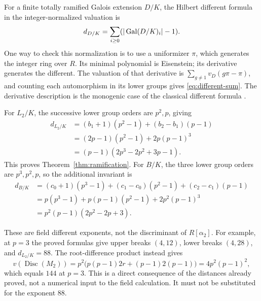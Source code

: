 For a finite totally ramified Galois extension \(D/K\), the
Hilbert different formula in the integer-normalized valuation is
\begin{equation}\label{eq:different-sum}
 d_{D/K}=\sum_{i\ge0}(|\operatorname{Gal}(D/K)_i|-1).
\end{equation}
One way to check this normalization is to use a uniformizer
\(\pi\), which generates the integer ring over \(R\).
Its minimal polynomial is Eisenstein; its derivative
generates the different. The valuation of that derivative
is \(\sum_{g\ne1}v_D(g\pi-\pi)\), and counting each
automorphism in its lower groups gives
\eqref{eq:different-sum}. The derivative description is
the monogenic case of the classical different formula
\cite[Tags 0BWD and 0BWG]{stacksdifferent}.

For \(L_2/K\), the successive lower group orders are
\(p^2,p\), giving
\[
 \begin{aligned}
 d_{L_2/K}
 &=(b_1+1)(p^2-1)+(b_2-b_1)(p-1)\\
 &=(2p-1)(p^2-1)+2p(p-1)^3\\
 &=(p-1)(2p^3-2p^2+3p-1).
 \end{aligned}
\]
This proves Theorem~\ref{thm:ramification}.
For \(B/K\), the three lower group orders are \(p^3,p^2,p\),
so the additional invariant is
\[
 \begin{aligned}
 d_{B/K}
 &=(c_0+1)(p^3-1)+(c_1-c_0)(p^2-1)
   +(c_2-c_1)(p-1)\\
 &=p(p^3-1)+p(p-1)(p^2-1)+2p^2(p-1)^3\\
 &=p^2(p-1)(2p^2-2p+3).
 \end{aligned}
\]

These are field different exponents, not the discriminant
of \(R[\alpha_2]\). For example, at \(p=3\) the proved
formulas give upper breaks \((4,12)\), lower breaks
\((4,28)\), and \(d_{L_2/K}=88\).
The root-difference product instead gives
\[
 v(\operatorname{Disc}(M_2))
 =p^2\bigl(p(p-1)2r+(p-1)2(p-1)\bigr)
 =4p^2(p-1)^2,
\]
which equals \(144\) at \(p=3\).
This is a direct consequence of the distances already
proved, not a numerical input to the field calculation.
It must not be substituted for the exponent \(88\).
